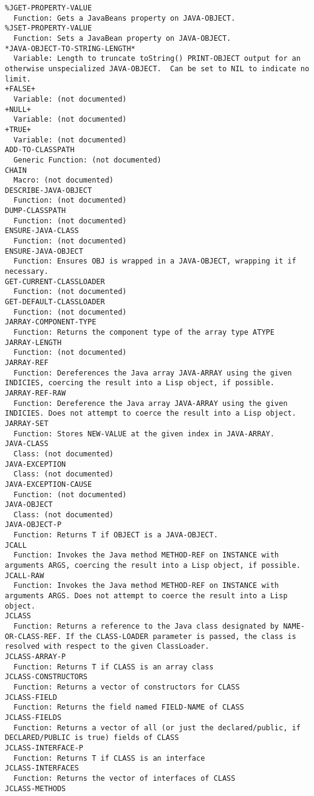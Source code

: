 \begin{verbatim}
%JGET-PROPERTY-VALUE
  Function: Gets a JavaBeans property on JAVA-OBJECT.
%JSET-PROPERTY-VALUE
  Function: Sets a JavaBean property on JAVA-OBJECT.
*JAVA-OBJECT-TO-STRING-LENGTH*
  Variable: Length to truncate toString() PRINT-OBJECT output for an otherwise unspecialized JAVA-OBJECT.  Can be set to NIL to indicate no limit.
+FALSE+
  Variable: (not documented)
+NULL+
  Variable: (not documented)
+TRUE+
  Variable: (not documented)
ADD-TO-CLASSPATH
  Generic Function: (not documented)
CHAIN
  Macro: (not documented)
DESCRIBE-JAVA-OBJECT
  Function: (not documented)
DUMP-CLASSPATH
  Function: (not documented)
ENSURE-JAVA-CLASS
  Function: (not documented)
ENSURE-JAVA-OBJECT
  Function: Ensures OBJ is wrapped in a JAVA-OBJECT, wrapping it if necessary.
GET-CURRENT-CLASSLOADER
  Function: (not documented)
GET-DEFAULT-CLASSLOADER
  Function: (not documented)
JARRAY-COMPONENT-TYPE
  Function: Returns the component type of the array type ATYPE
JARRAY-LENGTH
  Function: (not documented)
JARRAY-REF
  Function: Dereferences the Java array JAVA-ARRAY using the given INDICIES, coercing the result into a Lisp object, if possible.
JARRAY-REF-RAW
  Function: Dereference the Java array JAVA-ARRAY using the given INDICIES. Does not attempt to coerce the result into a Lisp object.
JARRAY-SET
  Function: Stores NEW-VALUE at the given index in JAVA-ARRAY.
JAVA-CLASS
  Class: (not documented)
JAVA-EXCEPTION
  Class: (not documented)
JAVA-EXCEPTION-CAUSE
  Function: (not documented)
JAVA-OBJECT
  Class: (not documented)
JAVA-OBJECT-P
  Function: Returns T if OBJECT is a JAVA-OBJECT.
JCALL
  Function: Invokes the Java method METHOD-REF on INSTANCE with arguments ARGS, coercing the result into a Lisp object, if possible.
JCALL-RAW
  Function: Invokes the Java method METHOD-REF on INSTANCE with arguments ARGS. Does not attempt to coerce the result into a Lisp object.
JCLASS
  Function: Returns a reference to the Java class designated by NAME-OR-CLASS-REF. If the CLASS-LOADER parameter is passed, the class is resolved with respect to the given ClassLoader.
JCLASS-ARRAY-P
  Function: Returns T if CLASS is an array class
JCLASS-CONSTRUCTORS
  Function: Returns a vector of constructors for CLASS
JCLASS-FIELD
  Function: Returns the field named FIELD-NAME of CLASS
JCLASS-FIELDS
  Function: Returns a vector of all (or just the declared/public, if DECLARED/PUBLIC is true) fields of CLASS
JCLASS-INTERFACE-P
  Function: Returns T if CLASS is an interface
JCLASS-INTERFACES
  Function: Returns the vector of interfaces of CLASS
JCLASS-METHODS

\end{verbatim}
